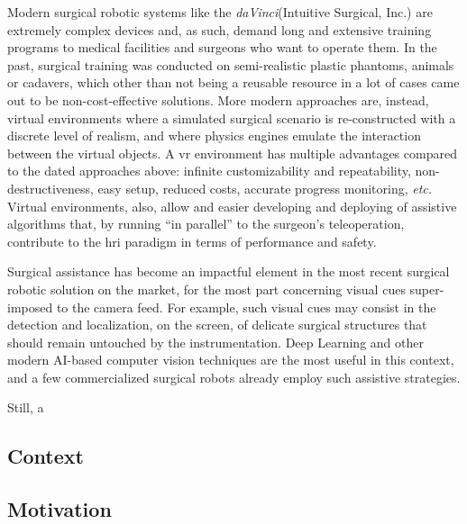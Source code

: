 \documentclass[../main.tex]{subfiles}
\begin{document}
Modern surgical robotic systems like the \textit{daVinci}\cright (Intuitive Surgical, Inc.) are extremely complex devices and, as such, demand long and extensive training programs to medical facilities and surgeons who want to operate them. In the past, surgical training was conducted on semi-realistic plastic phantoms, animals or cadavers, which other than not being a reusable resource in a lot of cases came out to be non-cost-effective solutions. More modern approaches are, instead, virtual environments where a simulated surgical scenario is re-constructed with a discrete level of realism, and where physics engines emulate the interaction between the virtual objects. A \ac{vr} environment has multiple advantages compared to the dated approaches above: infinite customizability and repeatability, non-destructiveness, easy setup, reduced costs, accurate progress monitoring, \textit{etc.} Virtual environments, also, allow and easier developing and deploying of assistive algorithms that, by running ``in parallel'' to the surgeon's teleoperation, contribute to the \ac{hri} paradigm in terms of performance and safety. 

Surgical assistance has become an impactful element in the most recent surgical robotic solution on the market, for the most part concerning visual cues super-imposed to the camera feed. For example, such visual cues may consist in the detection and localization, on the screen, of delicate surgical structures that should remain untouched by the instrumentation. Deep Learning and other modern AI-based computer vision techniques are the most useful in this context, and a few commercialized surgical robots already employ such assistive strategies.

Still, a

\subsection{Context}

\subsection{Motivation}
\textit{}



\end{document}
